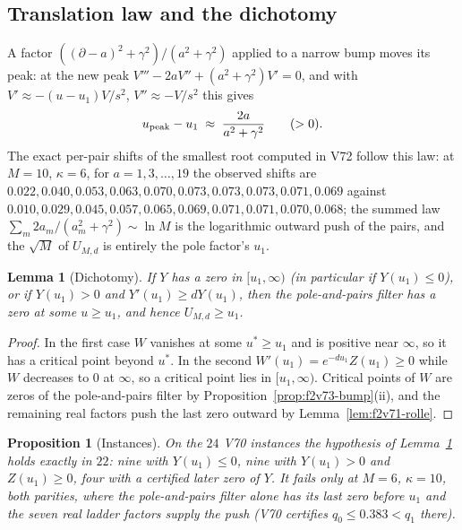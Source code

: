 \documentclass[11pt]{article}
\newtheorem{proposition}[theorem]{Proposition}
\newtheorem{lemma}[theorem]{Lemma}
\theoremstyle{definition}
\theoremstyle{remark}
\begin{document}
\subsection{Translation law and the dichotomy}

A factor \(((\partial-a)^2+\gamma^2)/(a^2+\gamma^2)\) applied to a narrow
bump moves its peak: at the new peak
\(V'''-2aV''+(a^2+\gamma^2)V'=0\), and with \(V'\approx-(u-u_1)V/s^2\),
\(V''\approx-V/s^2\) this gives
\begin{equation}
 u_{\rm peak}-u_1\;\approx\;\frac{2a}{a^2+\gamma^2}\qquad(>0).
 \label{eq:f2v73-translation}
\end{equation}
The exact per-pair shifts of the smallest root computed in V72 follow
this law: at \(M=10\), \(\kappa=6\), for \(a=1,3,\dots,19\) the observed
shifts are \(0.022,0.040,0.053,0.063,0.070,0.073,0.073,0.073,0.071,0.069\)
against \(0.010,0.029,0.045,0.057,0.065,0.069,0.071,0.071,0.070,0.068\);
the summed law \(\sum_m2a_m/(a_m^2+\gamma^2)\sim\ln M\) is the
logarithmic outward push of the pairs, and the \(\sqrt M\) of
\(U_{M,d}\) is entirely the pole factor's \(u_1\).

\begin{lemma}[Dichotomy]
\label{lem:f2v73-dichotomy}
If \(Y\) has a zero in \([u_1,\infty)\) (in particular if \(Y(u_1)\le0\)),
or if \(Y(u_1)>0\) and \(Y'(u_1)\ge dY(u_1)\), then the pole-and-pairs
filter has a zero at some \(u\ge u_1\), and hence \(U_{M,d}\ge u_1\).
\end{lemma}

\begin{proof}
In the first case \(W\) vanishes at some \(u^*\ge u_1\) and is positive
near \(\infty\), so it has a critical point beyond \(u^*\).  In the second
\(W'(u_1)=e^{-du_1}Z(u_1)\ge0\) while \(W\) decreases to \(0\) at
\(\infty\), so a critical point lies in \([u_1,\infty)\).  Critical points
of \(W\) are zeros of the pole-and-pairs filter by
Proposition~\ref{prop:f2v73-bump}(ii), and the remaining real factors push
the last zero outward by Lemma~\ref{lem:f2v71-rolle}.
\end{proof}

\begin{proposition}[Instances]
\label{prop:f2v73-instances}
On the \(24\) V70 instances the hypothesis of
Lemma~\ref{lem:f2v73-dichotomy} holds exactly in \(22\): nine with
\(Y(u_1)\le0\), nine with \(Y(u_1)>0\) and \(Z(u_1)\ge0\), four with a
certified later zero of \(Y\).  It fails only at \(M=6\), \(\kappa=10\),
both parities, where the pole-and-pairs filter alone has its last zero
before \(u_1\) and the seven real ladder factors supply the push (V70
certifies \(q_0\le0.383<q_1\) there).
\end{proposition}
\end{document}
